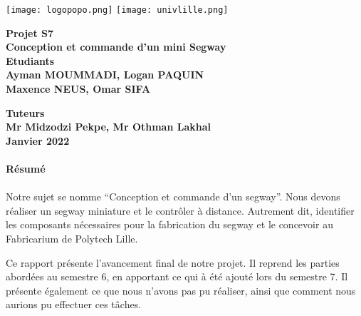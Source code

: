 \documentclass[oneside,a4paper,12pt]{article}
\begin{document}
	\begin{titlepage}
		\texttt{[image: logopopo.png]}
		\hspace*{\fill}
		\texttt{[image: univlille.png]}
		
		\begin{center}
			\vspace{1cm}
			\textbf{Projet S7}\\
			\textbf{Conception et commande d'un mini Segway}\\
			\vspace{1cm}
			\textbf{Etudiants}\\
			\textbf{Ayman MOUMMADI, Logan PAQUIN}\\
			\textbf{Maxence NEUS, Omar SIFA}\\
			\vspace{2cm}
			
			\textbf{Tuteurs}\\
			\textbf{Mr Midzodzi Pekpe, Mr Othman Lakhal}\\
			
			\vspace{\fill}
			\textbf{Janvier 2022}\\
		\end{center}
	\end{titlepage}
	
	\newpage
	\vspace{\fill}
	\paragraph{Résumé}\paragraph{}
	
	Notre sujet se nomme “Conception et commande d’un segway”. Nous devons réaliser un segway miniature et le contrôler à distance. Autrement dit, identifier les composants nécessaires pour la fabrication du segway et le concevoir au Fabricarium de Polytech Lille.
	
	Ce rapport présente l’avancement final de notre projet. Il reprend les parties abordées au semestre 6, en apportant ce qui à été ajouté lors du semestre 7. Il présente également ce que nous n’avons pas pu réaliser, ainsi que comment nous aurions pu effectuer ces tâches.
	
	\vspace{\fill}
\end{document}
